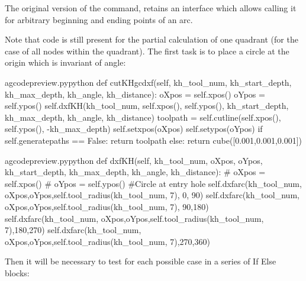 \documentclass{ltxdoc}
\begin{document}
 
The original version of the command,  retains an interface which allows calling it for arbitrary beginning and ending points of an arc. 

Note that code is still present for the partial calculation of one quadrant (for the case of all nodes within the quadrant). The first task is to place a circle at the origin which is invariant of angle:
 
\lstset{firstnumber=\thegcpy}
\begin{writecode}{a}{gcodepreview.py}{python}
    def cutKHgcdxf(self, kh_tool_num, kh_start_depth, kh_max_depth, kh_angle, kh_distance):
        oXpos = self.xpos()
        oYpos = self.ypos()
        self.dxfKH(kh_tool_num, self.xpos(), self.ypos(), kh_start_depth, kh_max_depth, kh_angle, kh_distance)
        toolpath = self.cutline(self.xpos(), self.ypos(), -kh_max_depth)
        self.setxpos(oXpos)
        self.setypos(oYpos)
        if self.generatepaths == False:
            return toolpath
        else: 
            return cube([0.001,0.001,0.001])

\end{writecode}
\addtocounter{gcpy}{12}

\lstset{firstnumber=\thegcpy}
\begin{writecode}{a}{gcodepreview.py}{python}
    def dxfKH(self, kh_tool_num, oXpos, oYpos, kh_start_depth, kh_max_depth, kh_angle, kh_distance):
#        oXpos = self.xpos()
#        oYpos = self.ypos()
#Circle at entry hole
        self.dxfarc(kh_tool_num, oXpos,oYpos,self.tool_radius(kh_tool_num, 7),  0, 90)
        self.dxfarc(kh_tool_num, oXpos,oYpos,self.tool_radius(kh_tool_num, 7), 90,180)
        self.dxfarc(kh_tool_num, oXpos,oYpos,self.tool_radius(kh_tool_num, 7),180,270)
        self.dxfarc(kh_tool_num, oXpos,oYpos,self.tool_radius(kh_tool_num, 7),270,360)

\end{writecode}
\addtocounter{gcpy}{12}

Then it will be necessary to test for each possible case in a series of If Else blocks:
 
\end{document}
